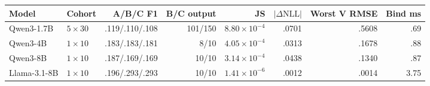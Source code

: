 \begin{tabular}{llrrrrrr}
\toprule
Model & Cohort & A/B/C F1 & B/C output & JS & $|\Delta\mathrm{NLL}|$ & Worst V RMSE & Bind ms \\
\midrule
Qwen3-1.7B & $5\times30$ & .119/.110/.108 & 101/150 & $8.80\times10^{-4}$ & .0701 & .5608 & .69 \\
Qwen3-4B & $1\times10$ & .183/.183/.181 & 8/10 & $4.05\times10^{-4}$ & .0313 & .1678 & .88 \\
Qwen3-8B & $1\times10$ & .187/.169/.169 & 10/10 & $3.14\times10^{-4}$ & .0438 & .1340 & .87 \\
Llama-3.1-8B & $1\times10$ & .196/.293/.293 & 10/10 & $1.41\times10^{-6}$ & .0012 & .0014 & 3.75 \\
\bottomrule
\end{tabular}
